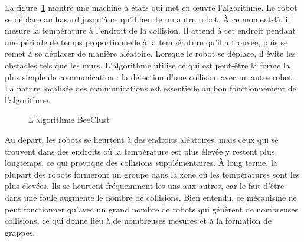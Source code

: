La figure~\ref{fig.beeclust} montre une machine à états qui met en œuvre l'algorithme. Le robot se déplace au hasard jusqu'à ce qu'il heurte un autre robot. À ce moment-là, il mesure la température à l'endroit de la collision. Il attend à cet endroit pendant une période de temps proportionnelle à la température qu'il a trouvée, puis se remet à se déplacer de manière aléatoire. Lorsque le robot se déplace, il évite les obstacles tels que les murs. L'algorithme utilise ce qui est peut-être la forme la plus simple de communication : la détection d'une collision avec un autre robot. La nature localisée des communications est essentielle au bon fonctionnement de l'algorithme.

\begin{figure}
\begin{center}
\end{center}
\caption{L'algorithme BeeClust}\label{fig.beeclust}
\end{figure}

Au départ, les robots se heurtent à des endroits aléatoires, mais ceux qui se trouvent dans des endroits où la température est plus élevée y restent plus longtemps, ce qui provoque des collisions supplémentaires. À long terme, la plupart des robots formeront un groupe dans la zone où les températures sont les plus élevées. Ils se heurtent fréquemment les uns aux autres, car le fait d'être dans une foule augmente le nombre de collisions. Bien entendu, ce mécanisme ne peut fonctionner qu'avec un grand nombre de robots qui génèrent de nombreuses collisions, ce qui donne lieu à de nombreuses mesures et à la formation de grappes. 

